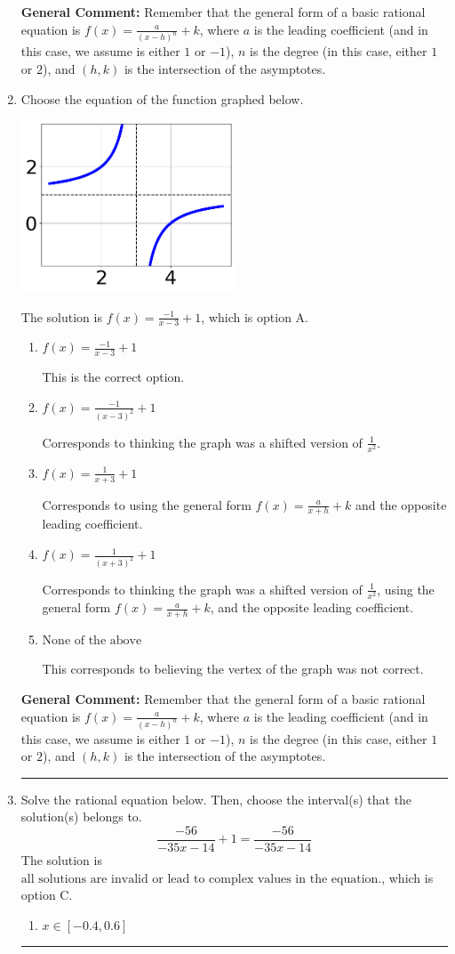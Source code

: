 \documentclass{extbook}[14pt]
\newcommand{\litem}[1]{\item #1

\rule{\textwidth}{0.4pt}}
\begin{document}
\begin{enumerate}
{\textbf{General Comment:} Remember that the general form of a basic rational equation is $ f(x) = \frac{a}{(x-h)^n} + k$, where $a$ is the leading coefficient (and in this case, we assume is either $1$ or $-1$), $n$ is the degree (in this case, either $1$ or $2$), and $(h, k)$ is the intersection of the asymptotes.
}
\litem{
Choose the equation of the function graphed below.

\begin{center}
    \includegraphics[width=0.5\textwidth]{../Figures/rationalGraphToEquationB.png}
\end{center}


The solution is \( f(x) = \frac{-1}{x - 3} + 1 \), which is option A.\begin{enumerate}[label=\Alph*.]
\item \( f(x) = \frac{-1}{x - 3} + 1 \)

This is the correct option.
\item \( f(x) = \frac{-1}{(x - 3)^2} + 1 \)

Corresponds to thinking the graph was a shifted version of $\frac{1}{x^2}$.
\item \( f(x) = \frac{1}{x + 3} + 1 \)

Corresponds to using the general form $f(x) = \frac{a}{x+h}+k$ and the opposite leading coefficient.
\item \( f(x) = \frac{1}{(x + 3)^2} + 1 \)

Corresponds to thinking the graph was a shifted version of $\frac{1}{x^2}$, using the general form $f(x) = \frac{a}{x+h}+k$, and the opposite leading coefficient.
\item \( \text{None of the above} \)

This corresponds to believing the vertex of the graph was not correct.
\end{enumerate}

\textbf{General Comment:} Remember that the general form of a basic rational equation is $ f(x) = \frac{a}{(x-h)^n} + k$, where $a$ is the leading coefficient (and in this case, we assume is either $1$ or $-1$), $n$ is the degree (in this case, either $1$ or $2$), and $(h, k)$ is the intersection of the asymptotes.
}
\litem{
Solve the rational equation below. Then, choose the interval(s) that the solution(s) belongs to.
\[ \frac{-56}{-35x -14} + 1 = \frac{-56}{-35x -14} \]The solution is \( \text{all solutions are invalid or lead to complex values in the equation.} \), which is option C.\begin{enumerate}[label=\Alph*.]
\item \( x \in [-0.4,0.6] \)


\end{enumerate}}
\end{enumerate}
\end{document}
